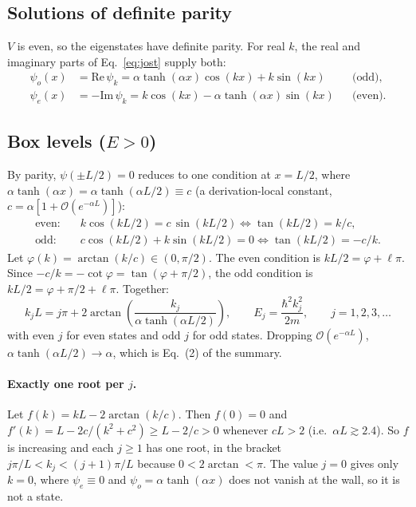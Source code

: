 \documentclass[11pt]{article}
\numberwithin{equation}{section}
\begin{document}
\subsection{Solutions of definite parity}
$V$ is even, so the eigenstates have definite parity. For real $k$, the real and imaginary parts of Eq.~\eqref{eq:jost} supply both:
\begin{align}
\psi_o(x)&=\mathrm{Re}\,\psi_k=\alpha\tanh(\alpha x)\cos(kx)+k\sin(kx) &&\text{(odd)},\label{eq:psio}\\
\psi_e(x)&=-\mathrm{Im}\,\psi_k=k\cos(kx)-\alpha\tanh(\alpha x)\sin(kx) &&\text{(even)}.\label{eq:psie}
\end{align}

\subsection{Box levels (\texorpdfstring{$E>0$}{E > 0})}
By parity, $\psi(\pm L/2)=0$ reduces to one condition at $x=L/2$, where $\alpha\tanh(\alpha x)=\alpha\tanh(\alpha L/2)\equiv c$ (a derivation-local constant, $c=\alpha[1+\mathcal O(e^{-\alpha L})]$):
\begin{align}
\text{even:}\quad& k\cos(kL/2)=c\,\sin(kL/2)\iff \tan(kL/2)=k/c,\\
\text{odd:}\quad& c\cos(kL/2)+k\sin(kL/2)=0\iff \tan(kL/2)=-c/k .
\end{align}
Let $\varphi(k)=\arctan(k/c)\in(0,\pi/2)$. The even condition is $kL/2=\varphi+\ell\pi$. Since $-c/k=-\cot\varphi=\tan(\varphi+\pi/2)$, the odd condition is $kL/2=\varphi+\pi/2+\ell\pi$. Together:
\begin{equation}
\boxed{\;k_jL=j\pi+2\arctan\!\left(\frac{k_j}{\alpha\tanh(\alpha L/2)}\right),\qquad E_j=\frac{\hbar^2k_j^2}{2m},\qquad j=1,2,3,\dots\;}
\label{eq:quant}
\end{equation}
with even $j$ for even states and odd $j$ for odd states. Dropping $\mathcal O(e^{-\alpha L})$, $\alpha\tanh(\alpha L/2)\to\alpha$, which is Eq.~(2) of the summary.

\paragraph{Exactly one root per $j$.} Let $f(k)=kL-2\arctan(k/c)$. Then $f(0)=0$ and $f'(k)=L-2c/(k^2+c^2)\ge L-2/c>0$ whenever $cL>2$ (i.e.\ $\alpha L\gtrsim2.4$). So $f$ is increasing and each $j\ge1$ has one root, in the bracket $j\pi/L<k_j<(j+1)\pi/L$ because $0<2\arctan<\pi$. The value $j=0$ gives only $k=0$, where $\psi_e\equiv0$ and $\psi_o=\alpha\tanh(\alpha x)$ does not vanish at the wall, so it is not a state.
\end{document}
